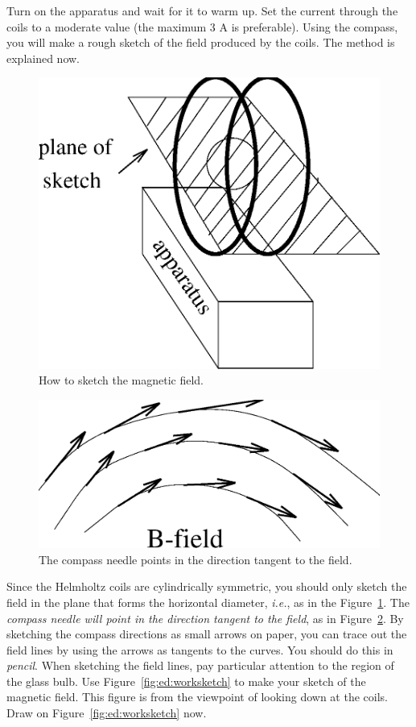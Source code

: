 \noindent Turn on the apparatus and wait for it to warm up.  Set the current 
through the coils to a moderate value (the maximum 3 A is preferable).  Using
the compass, you will make a rough sketch of the field produced by the coils.
The method is explained now.  
\begin{figure}[htb]
\centering \epsfxsize=5cm \includegraphics[scale=0.5]{3_electrondynamics/sketch.eps} 
\caption{How to sketch the magnetic field.} 
\label{fig:ed:sketch}
\end{figure}

\begin{figure}[htb]
\centering \epsfxsize=5cm \includegraphics[scale=0.4]{3_electrondynamics/bfield.eps}
\caption{The compass needle points in the direction tangent to the field.}
\label{fig:ed:bfield}
\end{figure}

\noindent Since the Helmholtz coils are cylindrically symmetric, you should
only sketch the field in the plane that forms the horizontal diameter, {\it
i.e.}, as in the Figure~\ref{fig:ed:sketch}. The {\it compass needle will point
in the direction tangent to the field}, as in Figure~\ref{fig:ed:bfield}.
By sketching the compass directions as small arrows on paper, 
you can trace out the field lines by using the arrows as tangents to the
curves. You should do this in {\it pencil}.  When sketching the field lines,
pay particular attention to the region of the glass bulb.  
Use Figure~\ref{fig:ed:worksketch} to make your sketch of the magnetic field. 
This figure is from the viewpoint of looking down at the coils.  Draw
on Figure~\ref{fig:ed:worksketch} now.


